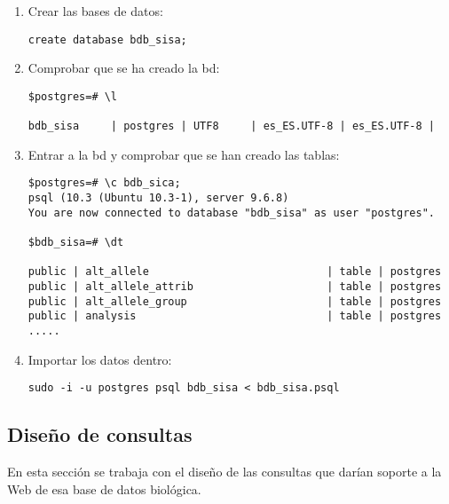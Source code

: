 \documentclass[12pt,a4paper]{article}
\begin{document}
\begin{enumerate}
Haciendo este cambio sobre todas las bases de datos, se corrige el error y ya se pueden crear las bases de datos e introducirle los datos del archivo psql correcto (\verb|bdb_sisa.psql| ).

\item Crear las bases de datos:
\begin{verbatim}
create database bdb_sisa;
\end{verbatim}

\item Comprobar que se ha creado la bd:
\begin{verbatim}
$postgres=# \l

bdb_sisa     | postgres | UTF8     | es_ES.UTF-8 | es_ES.UTF-8 | 
\end{verbatim}

\item Entrar a la bd y comprobar que se han creado las tablas:
\begin{verbatim}
$postgres=# \c bdb_sica;
psql (10.3 (Ubuntu 10.3-1), server 9.6.8)
You are now connected to database "bdb_sisa" as user "postgres".

$bdb_sisa=# \dt

public | alt_allele                            | table | postgres
public | alt_allele_attrib                     | table | postgres
public | alt_allele_group                      | table | postgres
public | analysis                              | table | postgres
.....
\end{verbatim}

\item Importar los datos dentro: 

\begin{verbatim} 
sudo -i -u postgres psql bdb_sisa < bdb_sisa.psql
\end{verbatim}


\end{enumerate}






\newpage
\subsection{Diseño de consultas} \label{pto22}

En esta sección se trabaja con el diseño de las consultas que darían soporte a la Web de esa base de datos biológica.
\end{document}
